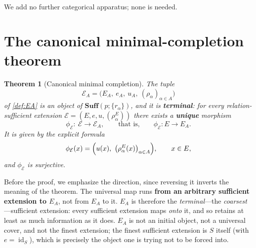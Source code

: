 \documentclass[11pt,reqno]{amsart}
\theoremstyle{plain}
\newtheorem{theorem}{Theorem}[section]
\theoremstyle{definition}
\theoremstyle{remark}
\numberwithin{equation}{section}
\DeclareMathOperator{\id}{id}
\begin{document}
We add no further categorical apparatus; none is needed.

\section{The canonical minimal-completion theorem}
\label{sec:main}

\begin{theorem}[Canonical minimal completion]
\label{thm:terminal}
The tuple
\begin{equation}
\label{eq:EA-object}
\mathcal E_A=\bigl(E_A,\ e_A,\ u_A,\ (\rho_\alpha)_{\alpha\in A}\bigr)
\end{equation}
of \cref{def:EA} is an object of $\mathbf{Suff}(p;\{r_\alpha\})$, and it is \textbf{terminal}: for
every relation-sufficient extension $\mathcal E=(E,e,u,(\rho_\alpha^E))$ there exists a
\textbf{unique} morphism
\begin{equation}
\label{eq:phiE-direction}
\phi_{\mathcal E}\colon\ \mathcal E\longrightarrow\mathcal E_A,
\qquad\text{that is,}\qquad
\phi_{\mathcal E}\colon E\longrightarrow E_A .
\end{equation}
It is given by the explicit formula
\begin{equation}
\label{eq:phiE}
\phi_{\mathcal E}(x)=\Bigl(u(x),\ \bigl(\rho_\alpha^E(x)\bigr)_{\alpha\in A}\Bigr),
\qquad x\in E,
\end{equation}
and $\phi_{\mathcal E}$ is surjective.
\end{theorem}

Before the proof, we emphasize the direction, since reversing it inverts the meaning of the theorem.
The universal map runs \textbf{from an arbitrary sufficient extension to $E_A$}, not from $E_A$ to
it. $E_A$ is therefore the \emph{terminal}---the \emph{coarsest}---sufficient extension: every
sufficient extension maps \emph{onto} it, and so retains at least as much information as it does.
$E_A$ is not an initial object, not a universal cover, and not the finest extension; the finest
sufficient extension is $S$ itself (with $e=\id_S$), which is precisely the object one is trying not
to be forced into.
\end{document}
